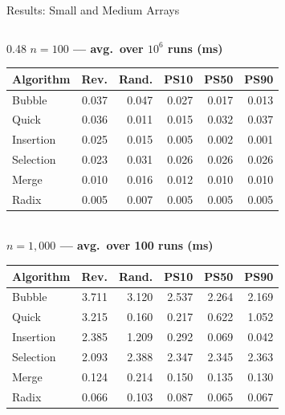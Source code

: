 \documentclass[aspectratio=169]{beamer}
\begin{document}
\begin{frame}{Results: Small and Medium Arrays}
  \begin{columns}[T]
    \begin{column}{0.48\textwidth}
      \centering
      \textbf{$n=100$ — avg.\ over $10^6$ runs (ms)}\\[0.3em]
      \tiny\setlength{\tabcolsep}{3pt}
      \begin{tabular}{lrrrrr}
        \toprule
        \textbf{Algorithm} & \textbf{Rev.} & \textbf{Rand.} & \textbf{PS10} & \textbf{PS50} & \textbf{PS90} \\
        \midrule
        Bubble    & 0.037 & 0.047 & 0.027 & 0.017 & 0.013 \\
        Quick     & 0.036 & 0.011 & 0.015 & 0.032 & 0.037 \\
        Insertion & 0.025 & 0.015 & 0.005 & 0.002 & 0.001 \\
        Selection & 0.023 & 0.031 & 0.026 & 0.026 & 0.026 \\
        Merge     & 0.010 & 0.016 & 0.012 & 0.010 & 0.010 \\
        Radix     & 0.005 & 0.007 & 0.005 & 0.005 & 0.005 \\
        \bottomrule
      \end{tabular}\\[0.6em]
      \textbf{$n=1{,}000$ — avg.\ over 100 runs (ms)}\\[0.3em]
      \begin{tabular}{lrrrrr}
        \toprule
        \textbf{Algorithm} & \textbf{Rev.} & \textbf{Rand.} & \textbf{PS10} & \textbf{PS50} & \textbf{PS90} \\
        \midrule
        Bubble    & 3.711 & 3.120 & 2.537 & 2.264 & 2.169 \\
        Quick     & 3.215 & 0.160 & 0.217 & 0.622 & 1.052 \\
        Insertion & 2.385 & 1.209 & 0.292 & 0.069 & 0.042 \\
        Selection & 2.093 & 2.388 & 2.347 & 2.345 & 2.363 \\
        Merge     & 0.124 & 0.214 & 0.150 & 0.135 & 0.130 \\
        Radix     & 0.066 & 0.103 & 0.087 & 0.065 & 0.067 \\
        \bottomrule
      \end{tabular}

\end{column}
\end{columns}
\end{frame}
\end{document}

